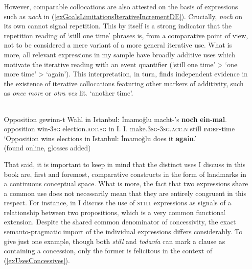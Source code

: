 However, comparable collocations are also attested on the basis of expressions such as  \textit{noch} in (\ref{exGoalsLimitationsIterativeIncrementDE}). Crucially, \textit{noch} on its own cannot signal repetition. This by itself is a strong indicator that the repetition reading of \lq still one time\rq{ }phrases is, from a comparative point of view, not to be considered a mere variant of a more general iterative use. What is more, all relevant expressions in my sample have broadly additive uses which motivate the iterative reading with an event quantifier (\lq still one time' > \lq one more time' > \lq again'). This interpretation, in turn, finds independent evidence in the existence of iterative collocations featuring other markers of additivity, such as  \textit{once more} or  \textit{otra vez} lit. \lq another time\rq{}.

\begin{exe}
	\ex {}\label{exGoalsLimitationsIterativeIncrementDE}\\
	\gll Opposition gewinn-t Wahl in Istanbul: İmamoğlu macht-'s \textbf{noch} \textbf{ein}-\textbf{mal}.\\
	opposition win-3\textsc{sg} election.\textsc{acc}.\textsc{sg} in I. I. make.3\textsc{sg}-3\textsc{sg}.\textsc{acc}.\textsc{n} still \textsc{indef}-time\\
	\glt \lq Opposition wins elections in Istanbul: İmamoğlu does it \textbf{again}.'
	\\(found online, glosses added)%
\end{exe} 

That said, it is important to keep in mind that the distinct uses I discuss in this book are, first and foremost, comparative constructs in the form of landmarks in a continuous conceptual space. What is more, the fact that two expressions share a common use does not necessarily mean that they are entirely congruent in this respect. For instance, in  I discuss the use of \textsc{still} expressions as signals of a  relationship between two propositions, which is a very common functional extension. Despite the shared common denominator of concessivity, the exact semanto-pragmatic import of the individual expressions differs considerably. To give just one example, though both  \textit{still} and  \textit{todavía} can mark a clause as containing a concession, only the former is felicitous in the context of (\ref{exUsesConcessives}).

